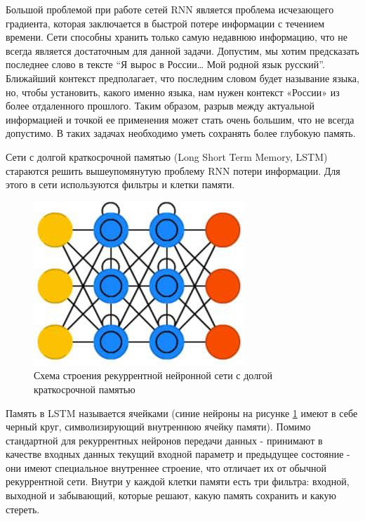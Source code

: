 Большой проблемой при работе сетей RNN является проблема исчезающего градиента, которая заключается в быстрой потере информации с течением времени. 
Сети способны хранить только самую недавнюю информацию, что не всегда является достаточным для данной задачи. 
Допустим, мы хотим предсказать последнее слово в тексте “Я вырос в России… Мой родной язык русский”. 
Ближайший контекст предполагает, что последним словом будет называние языка, но, чтобы установить, 
какого именно языка, нам нужен контекст «России» из более отдаленного прошлого. Таким образом, 
разрыв между актуальной информацией и точкой ее применения может стать очень большим, что не всегда допустимо. 
В таких задачах необходимо уметь сохранять более глубокую память.

Сети с долгой краткосрочной памятью (Long Short Term Memory, LSTM) стараются решить вышеупомянутую проблему RNN потери информации. 
Для этого в сети используются фильтры и клетки памяти.

\begin{figure}[h]
\includegraphics[width=0.75\columnwidth]{./img/recur_2.jpg}
\centering
\caption{Схема строения рекуррентной нейронной сети с долгой краткосрочной памятью}
\label{pic:recur_2}
\end{figure}

Память в LSTM называется ячейками (синие нейроны на рисунке  \ref{pic:recur_2} имеют в себе черный круг, 
символизирующий внутреннюю ячейку памяти). Помимо стандартной для 
рекуррентных нейронов передачи данных - принимают в качестве входных данных 
текущий входной параметр и предыдущее состояние - они имеют специальное внутреннее строение, 
что отличает их от обычной рекуррентной сети. 
Внутри у каждой клетки памяти есть три фильтра: входной, выходной и забывающий, которые решают, какую память сохранить и какую стереть.

